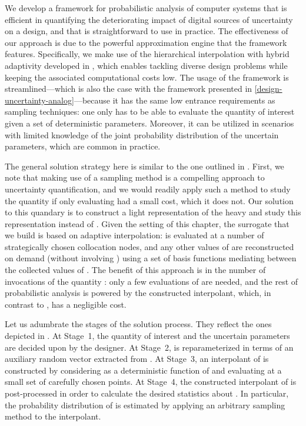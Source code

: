We develop a framework for probabilistic analysis of computer systems that is
efficient in quantifying the deteriorating impact of digital sources of
uncertainty on a design, and that is straightforward to use
in practice. The effectiveness of our approach is due to the powerful
approximation engine that the framework features. Specifically, we make use of
the hierarchical interpolation with hybrid adaptivity developed in
\cite{klimke2006, ma2009, jakeman2012}, which enables tackling diverse design
problems while keeping the associated computational costs low. The usage of the
framework is streamlined---which is also the case with the framework presented
in \cref{design-uncertainty-analog}---because it has the same low entrance
requirements as sampling techniques: one only has to be able to evaluate the
quantity of interest given a set of deterministic parameters. Moreover, it can
be utilized in scenarios with limited knowledge of the joint probability
distribution of the uncertain parameters, which are common in practice.

The general solution strategy here is similar to the one outlined in
. First, we note that making use of a sampling method is a
compelling approach to uncertainty quantification, and we would readily apply
such a method to study the quantity \g if only evaluating \g had a small cost,
which it does not. Our solution to this quandary is to construct a light
representation of the heavy \g and study this representation instead of \g.
Given the setting of this chapter, the surrogate that we build is based on
adaptive interpolation: \g is evaluated at a number of strategically chosen
collocation nodes, and any other values of \g are reconstructed on demand
(without involving \g) using a set of basis functions mediating between the
collected values of \g. The benefit of this approach is in the number of
invocations of the quantity \g: only a few evaluations of \g are needed, and the
rest of probabilistic analysis is powered by the constructed interpolant, which,
in contrast to \g, has a negligible cost.

Let us adumbrate the stages of the solution process. They reflect the ones
depicted in . At Stage~1, the quantity of interest \g and
the uncertain parameters \vu are decided upon by the designer. At Stage~2, \g is
reparameterized in terms of an auxiliary random vector \vz extracted from \vu.
At Stage~3, an interpolant of \g is constructed by considering \g as a
deterministic function of \vz and evaluating \g at a small set of carefully
chosen points. At Stage~4, the constructed interpolant of \g is post-processed
in order to calculate the desired statistics about \g. In particular, the
probability distribution of \g is estimated by applying an arbitrary sampling
method to the interpolant.

